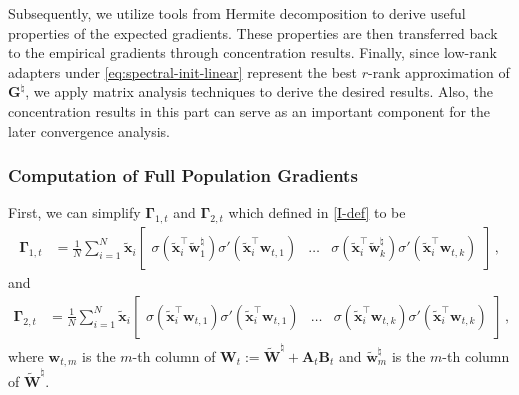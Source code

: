 Subsequently, we utilize tools from Hermite decomposition to derive useful properties of the expected gradients. These properties are then transferred back to the empirical gradients through concentration results. Finally, since low-rank adapters under \eqref{eq:spectral-init-linear} represent the best $r$-rank approximation of $\bm{G}^\natural$, we apply matrix analysis techniques to derive the desired results. Also, the concentration results in this part can serve as an important component for the later convergence analysis.


\subsubsection{Computation of Full Population Gradients}
First, we can simplify $\bm \Gamma_{1,t}$ and $\bm \Gamma_{2,t}$ which defined in \cref{I-def} to be
\begin{align*}
    \bm \Gamma_{1,t} & = \frac{1}{N} \sum_{i=1}^N \widetilde{\bm x}_i {\begin{bmatrix}
        \sigma \left(\widetilde{\bm x}_i^{\!\top}\widetilde{\bm w}_1^\natural\right)\sigma' \left(\widetilde{\bm x}_i^{\!\top}\bm w_{t,1}\right) &
        \hdots &
        \sigma \left(\widetilde{\bm x}_i^{\!\top}\widetilde{\bm w}_k^\natural\right) \sigma' \left(\widetilde{\bm x}_i^{\!\top}\bm w_{t,k}\right)
    \end{bmatrix}}\,,
\end{align*}
and
\begin{align*}
    \bm \Gamma_{2,t} & = \frac{1}{N} \sum_{i=1}^N \widetilde{\bm x}_i {\begin{bmatrix}
        \sigma \left(\widetilde{\bm x}_i^{\!\top}\bm w_{t,1}\right)\sigma' \left(\widetilde{\bm x}_i^{\!\top}\bm w_{t,1}\right)&
        \hdots &
        \sigma \left(\widetilde{\bm x}_i^{\!\top}\bm w_{t,k}\right) \sigma' \left(\widetilde{\bm x}_i^{\!\top}\bm w_{t,k}\right)
    \end{bmatrix}}\,,
\end{align*}
where $\bm w_{t,m}$ is the $m$-th column of $\bm W_t:= \widetilde{\bm W}^\natural + \bm A_t \bm B_t$ and $\widetilde{\bm w}^\natural_m$ is the $m$-th column of $\widetilde{\bm W}^\natural$.

